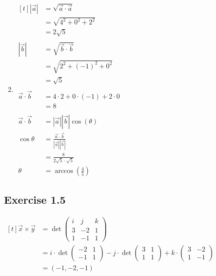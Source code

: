 \documentclass[11pt,fleqn]{book} %
\begin{document}
\begin{minipage}[t]{0.45\linewidth}
    \begin{enumerate} \setcounter{enumi}{1}
        \item 
        $\begin{aligned}[t]
            | \vec{a} |           & = \sqrt{\vec{a} \cdot \vec{a}}                          \\
                                  & = \sqrt{4^2 + 0^2 + 2^2}                                \\
                                  & = 2\sqrt{5}
            \\ \\
            | \vec{b} |           & = \sqrt{\vec{b} \cdot \vec{b}}                          \\
                                  & = \sqrt{2^2 + (-1)^2 + 0^2}                             \\
                                  & = \sqrt{5}
            \\ \\
            \vec{a} \cdot \vec{b} & = 4 \cdot 2 + 0 \cdot (-1) + 2 \cdot 0                  \\
                                  & = 8
            \\ \\
            \vec{a} \cdot \vec{b} & = | \vec{a} | | \vec{b} | \cos(\theta)                  \\
            \cos \theta           & = \frac{\vec{a} \cdot \vec{b}}{| \vec{a} | | \vec{b} |} \\
                                  & = \frac{8}{2\sqrt{5} \cdot \sqrt{5}}                    \\
            \theta                & = \arccos \left( \frac{4}{5} \right)
        \end{aligned}$
    \end{enumerate}
\end{minipage}

\vfill
\subsection*{Exercise 1.5}

$\begin{aligned}[t]
    \vec{x} \times \vec{y} 
    & = \det \begin{pmatrix} i & j & k \\ 3 & -2 & 1 \\ 1 & -1 & 1 \end{pmatrix} \\
    & = i \cdot \det \begin{pmatrix} -2 & 1 \\ -1 & 1 \end{pmatrix} - j \cdot \det \begin{pmatrix} 3 & 1 \\ 1 & 1 \end{pmatrix} + k \cdot \begin{pmatrix} 3 & -2 \\ 1 & -1 \end{pmatrix} \\
    & = (-1, -2, -1)
\end{aligned}$
\end{document}
